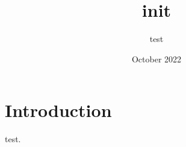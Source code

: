 \documentclass{article}
\title{init}
\author{test}
\date{October 2022}
\begin{document}
\maketitle

\section{Introduction}
test.
\end{document}
